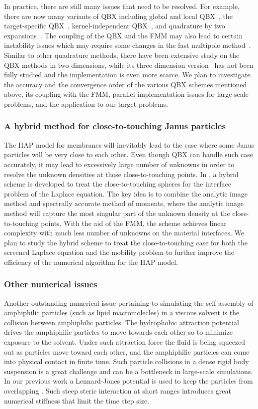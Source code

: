 In practice, there are still many issues that need to be resolved.
For example, there are now many variants of QBX including global and local
QBX~\cite{klockner2013jcp,rachh2017jcp}, the target-specific QBX~\cite{siegel2018jcp},
kernel-independent QBX~\cite{abtin2018bit}, and
quadrature by two expansions~\cite{ding2019arxiv}. The coupling of the QBX
and the FMM may also lead to certain instability issues which may require
some changes in the fast multipole method~\cite{wala2018jcp}. Similar
to other quadrature methods, there have been extensive study on the QBX
methods in two dimensions, while its three dimension
version~\cite{wala2019jcp,af2018sisc,siegel2018jcp,wala2019arxiv} has not been
fully studied and the implementation is even more scarce. We plan to investigate
the accuracy and the convergence order of the various QBX schemes mentioned above,
its coupling with the FMM, parallel implementation issues for large-scale
problems, and the application to our target problems.
\subsubsection{A hybrid method for close-to-touching Janus particles}
The HAP model for membranes will inevitably lead to the case where some Janus particles
will be very close to each other. Even though QBX can handle such case
accurately, it may lead to excessively large number of unknowns in order to resolve
the unknown densities at those close-to-touching points. In \cite{gan2016sisc},
a hybrid scheme is developed to treat the close-to-touching spheres for the interface
problem of the Laplace equation. The key idea is to combine the analytic image method
and spectrally accurate method of moments, where the analytic image method will capture
the most singular part of the unknown density at the close-to-touching points.
With the aid of the FMM, the scheme achieves linear complexity with much less number
of unknowns on the material interfaces.
We plan to study the hybrid scheme
to treat the close-to-touching case for both the screened Laplace equation and the
mobility problem to further improve the efficiency of the numerical algorithm
for the HAP model.
\subsubsection{Other numerical issues}
Another outstanding numerical issue pertaining to simulating the self-assembly of amphiphilic particles (such as lipid macromolecles) in a
viscous solvent is the collision between amphiphilic particles.
The hydrophobic attraction potential drives the amphiphilic particles to move towards each other so to minimize exposure to the solvent. 
Under such
attraction force the fluid is being squeezed out as particles move toward each other, and the amphiphilic particles can come into physical
contact in finite time. 
Such particle collisions in a dense rigid body suspension is a great challenge and can be a bottleneck in large-scale simulations. 
In our previous work a Lennard-Jones potential is used to keep the particles from overlapping \cite{Fu19}. 
Such steep steric interaction at
short ranges introduces great numerical stiffness that limit the time step size. 

